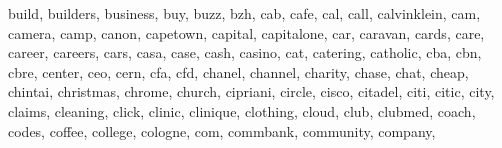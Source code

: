 \documentclass[letterpaper,10pt,english]{sphinxmanual}
\begin{document}
\begin{fulllineitems}
\begin{fulllineitems}
\textquotesingle{}build\textquotesingle{}, \textquotesingle{}builders\textquotesingle{}, \textquotesingle{}business\textquotesingle{}, \textquotesingle{}buy\textquotesingle{}, \textquotesingle{}buzz\textquotesingle{}, \textquotesingle{}bzh\textquotesingle{}, \textquotesingle{}cab\textquotesingle{}, \textquotesingle{}cafe\textquotesingle{}, \textquotesingle{}cal\textquotesingle{}, \textquotesingle{}call\textquotesingle{}, \textquotesingle{}calvinklein\textquotesingle{}, \textquotesingle{}cam\textquotesingle{}, \textquotesingle{}camera\textquotesingle{}, \textquotesingle{}camp\textquotesingle{}, \textquotesingle{}canon\textquotesingle{}, \textquotesingle{}capetown\textquotesingle{}, \textquotesingle{}capital\textquotesingle{}, \textquotesingle{}capitalone\textquotesingle{}, \textquotesingle{}car\textquotesingle{}, \textquotesingle{}caravan\textquotesingle{}, \textquotesingle{}cards\textquotesingle{}, \textquotesingle{}care\textquotesingle{}, \textquotesingle{}career\textquotesingle{}, \textquotesingle{}careers\textquotesingle{}, \textquotesingle{}cars\textquotesingle{}, \textquotesingle{}casa\textquotesingle{}, \textquotesingle{}case\textquotesingle{}, \textquotesingle{}cash\textquotesingle{}, \textquotesingle{}casino\textquotesingle{}, \textquotesingle{}cat\textquotesingle{}, \textquotesingle{}catering\textquotesingle{}, \textquotesingle{}catholic\textquotesingle{}, \textquotesingle{}cba\textquotesingle{}, \textquotesingle{}cbn\textquotesingle{}, \textquotesingle{}cbre\textquotesingle{}, \textquotesingle{}center\textquotesingle{}, \textquotesingle{}ceo\textquotesingle{}, \textquotesingle{}cern\textquotesingle{}, \textquotesingle{}cfa\textquotesingle{}, \textquotesingle{}cfd\textquotesingle{}, \textquotesingle{}chanel\textquotesingle{}, \textquotesingle{}channel\textquotesingle{}, \textquotesingle{}charity\textquotesingle{}, \textquotesingle{}chase\textquotesingle{}, \textquotesingle{}chat\textquotesingle{}, \textquotesingle{}cheap\textquotesingle{}, \textquotesingle{}chintai\textquotesingle{}, \textquotesingle{}christmas\textquotesingle{}, \textquotesingle{}chrome\textquotesingle{}, \textquotesingle{}church\textquotesingle{}, \textquotesingle{}cipriani\textquotesingle{}, \textquotesingle{}circle\textquotesingle{}, \textquotesingle{}cisco\textquotesingle{}, \textquotesingle{}citadel\textquotesingle{}, \textquotesingle{}citi\textquotesingle{}, \textquotesingle{}citic\textquotesingle{}, \textquotesingle{}city\textquotesingle{}, \textquotesingle{}claims\textquotesingle{}, \textquotesingle{}cleaning\textquotesingle{}, \textquotesingle{}click\textquotesingle{}, \textquotesingle{}clinic\textquotesingle{}, \textquotesingle{}clinique\textquotesingle{}, \textquotesingle{}clothing\textquotesingle{}, \textquotesingle{}cloud\textquotesingle{}, \textquotesingle{}club\textquotesingle{}, \textquotesingle{}clubmed\textquotesingle{}, \textquotesingle{}coach\textquotesingle{}, \textquotesingle{}codes\textquotesingle{}, \textquotesingle{}coffee\textquotesingle{}, \textquotesingle{}college\textquotesingle{}, \textquotesingle{}cologne\textquotesingle{}, \textquotesingle{}com\textquotesingle{}, \textquotesingle{}commbank\textquotesingle{}, \textquotesingle{}community\textquotesingle{}, \textquotesingle{}company\textquotesingle{}, 
\end{fulllineitems}
\end{fulllineitems}
\end{document}

